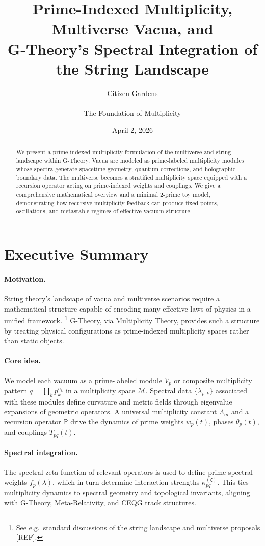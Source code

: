 \documentclass[11pt]{article}
\title{Prime-Indexed Multiplicity, Multiverse Vacua, and\\
G-Theory's Spectral Integration of the String Landscape}
\author{Citizen Gardens \\ \\ The Foundation of Multiplicity}
\date{April 2, 2026}
\begin{document}
\maketitle

\begin{abstract}
We present a prime-indexed multiplicity formulation of the multiverse and string landscape within G-Theory. 
Vacua are modeled as prime-labeled multiplicity modules whose spectra generate spacetime geometry, quantum corrections, and holographic boundary data.
The multiverse becomes a stratified multiplicity space equipped with a recursion operator acting on prime-indexed weights and couplings.
We give a comprehensive mathematical overview and a minimal 2-prime toy model, demonstrating how recursive multiplicity feedback can produce fixed points, oscillations, and metastable regimes of effective vacuum structure.
\end{abstract}

\section*{Executive Summary}

\paragraph{Motivation.}
String theory's landscape of vacua and multiverse scenarios require a mathematical structure capable of encoding many effective laws of physics in a unified framework.%
\footnote{See e.g.\ standard discussions of the string landscape and multiverse proposals [REF].}
G-Theory, via Multiplicity Theory, provides such a structure by treating physical configurations as prime-indexed multiplicity spaces rather than static objects.%

\paragraph{Core idea.}
We model each vacuum as a prime-labeled module \(V_p\) or composite multiplicity pattern \(q = \prod_k p_k^{n_k}\) in a multiplicity space \(\mathcal{M}\). 
Spectral data \(\{\lambda_{p,k}\}\) associated with these modules define curvature and metric fields through eigenvalue expansions of geometric operators.
A universal multiplicity constant \(\Lambda_m\) and a recursion operator \(\mathbb{P}\) drive the dynamics of prime weights \(w_p(t)\), phases \(\theta_p(t)\), and couplings \(T_{pq}(t)\).

\paragraph{Spectral integration.}
The spectral zeta function of relevant operators is used to define prime spectral weights \(f_p(\lambda)\), which in turn determine interaction strengths \(\kappa_{pq}^{(\zeta)}\).
This ties multiplicity dynamics to spectral geometry and topological invariants, aligning with G-Theory, Meta-Relativity, and CEQG track structures.
\end{document}
